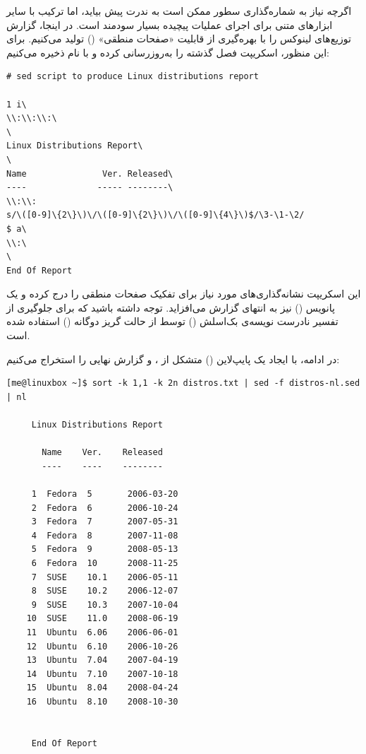 اگرچه نیاز به شماره‌گذاری سطور ممکن است به ندرت پیش بیاید، اما ترکیب  با سایر ابزارهای متنی برای اجرای عملیات پیچیده بسیار سودمند است. در اینجا، گزارش توزیع‌های لینوکس را با بهره‌گیری از قابلیت «صفحات منطقی» () تولید می‌کنیم. برای این منظور، اسکریپت  فصل گذشته را به‌روزرسانی کرده و با نام  ذخیره می‌کنیم:

\begin{latin}
\begin{lstlisting}
# sed script to produce Linux distributions report

1 i\
\\:\\:\\:\
\
Linux Distributions Report\
\
Name               Ver. Released\
----              ----- --------\
\\:\\:
s/\([0-9]\{2\}\)\/\([0-9]\{2\}\)\/\([0-9]\{4\}\)$/\3-\1-\2/
$ a\
\\:\
\
End Of Report
\end{lstlisting}
\end{latin}

این اسکریپت نشانه‌گذاری‌های مورد نیاز  برای تفکیک صفحات منطقی را درج کرده و یک پانویس () نیز به انتهای گزارش می‌افزاید. توجه داشته باشید که برای جلوگیری از تفسیر نادرست نویسه‌ی بک‌اسلش (\cmd{\textbackslash}) توسط  از حالت گریز دوگانه (\cmd{\textbackslash\textbackslash}) استفاده شده است.

در ادامه، با ایجاد یک پایپ‌لاین (\en{Pipeline}) متشکل از ،  و  گزارش نهایی را استخراج می‌کنیم:

\begin{latin}
\begin{lstlisting}
[me@linuxbox ~]$ sort -k 1,1 -k 2n distros.txt | sed -f distros-nl.sed | nl

     Linux Distributions Report

       Name    Ver.    Released
       ----    ----    --------

     1  Fedora  5       2006-03-20
     2  Fedora  6       2006-10-24
     3  Fedora  7       2007-05-31
     4  Fedora  8       2007-11-08
     5  Fedora  9       2008-05-13
     6  Fedora  10      2008-11-25
     7  SUSE    10.1    2006-05-11
     8  SUSE    10.2    2006-12-07
     9  SUSE    10.3    2007-10-04
    10  SUSE    11.0    2008-06-19
    11  Ubuntu  6.06    2006-06-01
    12  Ubuntu  6.10    2006-10-26
    13  Ubuntu  7.04    2007-04-19
    14  Ubuntu  7.10    2007-10-18
    15  Ubuntu  8.04    2008-04-24
    16  Ubuntu  8.10    2008-10-30


     End Of Report
\end{lstlisting}
\end{latin}

